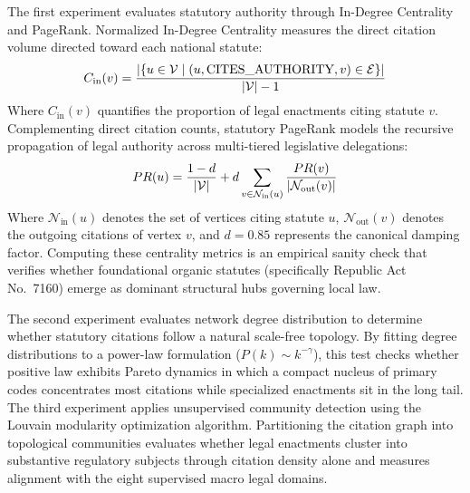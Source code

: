         The first experiment evaluates statutory authority through In-Degree Centrality and PageRank. Normalized In-Degree Centrality measures the direct citation volume directed toward each national statute:
        \begin{equation}
            C_{\text{in}}(v) = \frac{|\{u \in \mathcal{V} \mid (u, \text{CITES\_AUTHORITY}, v) \in \mathcal{E}\}|}{|\mathcal{V}| - 1}
            \label{eq:in_degree_centrality}
            \eqcaption{Normalized In-Degree Citation Centrality Formulation}
        \end{equation}
        \noindent Where $C_{\text{in}}(v)$ quantifies the proportion of legal enactments citing statute $v$. Complementing direct citation counts, statutory PageRank models the recursive propagation of legal authority across multi-tiered legislative delegations:
        \begin{equation}
            PR(u) = \frac{1 - d}{|\mathcal{V}|} + d \sum_{v \in \mathcal{N}_{\text{in}}(u)} \frac{PR(v)}{|\mathcal{N}_{\text{out}}(v)|}
            \label{eq:statutory_pagerank}
            \eqcaption{Statutory Authority PageRank Formulation}
        \end{equation}
        \noindent Where $\mathcal{N}_{\text{in}}(u)$ denotes the set of vertices citing statute $u$, $\mathcal{N}_{\text{out}}(v)$ denotes the outgoing citations of vertex $v$, and $d = 0.85$ represents the canonical damping factor. Computing these centrality metrics is an empirical sanity check that verifies whether foundational organic statutes (specifically Republic Act No.~7160) emerge as dominant structural hubs governing local law.

        The second experiment evaluates network degree distribution to determine whether statutory citations follow a natural scale-free topology. By fitting degree distributions to a power-law formulation ($P(k) \sim k^{-\gamma}$), this test checks whether positive law exhibits Pareto dynamics in which a compact nucleus of primary codes concentrates most citations while specialized enactments sit in the long tail. The third experiment applies unsupervised community detection using the Louvain modularity optimization algorithm. Partitioning the citation graph into topological communities evaluates whether legal enactments cluster into substantive regulatory subjects through citation density alone and measures alignment with the eight supervised macro legal domains.

